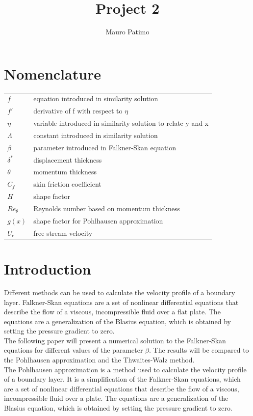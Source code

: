 \documentclass[conf]{new-aiaa}
\title{Project 2}
\author{Mauro Patimo}
\begin{document}
\maketitle

\section{Nomenclature}

{\renewcommand\arraystretch{1.0}
\noindent\begin{longtable*}{@{}l @{\quad=\quad} l@{}}
$f$  & equation introduced in similarity solution \\
$f'$ & derivative of f with respect to $\eta$ \\
$\eta$ & variable introduced in similarity solution to relate y and x\\
$\Lambda$ & constant introduced in similarity solution \\
$\beta$ & parameter introduced in Falkner-Skan equation \\
$\delta^*$ & displacement thickness \\
$\theta$ & momentum thickness \\
$C_f$ & skin friction coefficient \\
$H$ & shape factor \\
$Re_{\theta}$ & Reynolds number based on momentum thickness \\
$g(x)$ & shape factor for Pohlhausen approximation \\
$U_e$ & free stream velocity \\

\end{longtable*}}

\section{Introduction}
Different methods can be used to calculate the velocity profile of a boundary layer.
Falkner-Skan equations are a set of nonlinear differential equations that describe the flow of a viscous, incompressible fluid over a flat plate. The equations are a generalization of the Blasius equation, which is obtained by setting the pressure gradient to zero. \\
The following paper will present a numerical solution to the Falkner-Skan equations for different values of the parameter $\beta$. 
The results will be compared to the Pohlhausen approximation and the Thwaites-Walz method.\\
The Pohlhausen approximation is a method used to calculate the velocity profile of a boundary layer. It is a simplification of the Falkner-Skan equations, which are a set of nonlinear differential equations that describe the flow of a viscous, incompressible fluid over a plate. The equations are a generalization of the Blasius equation, which is obtained by setting the pressure gradient to zero. \\
\end{document}
